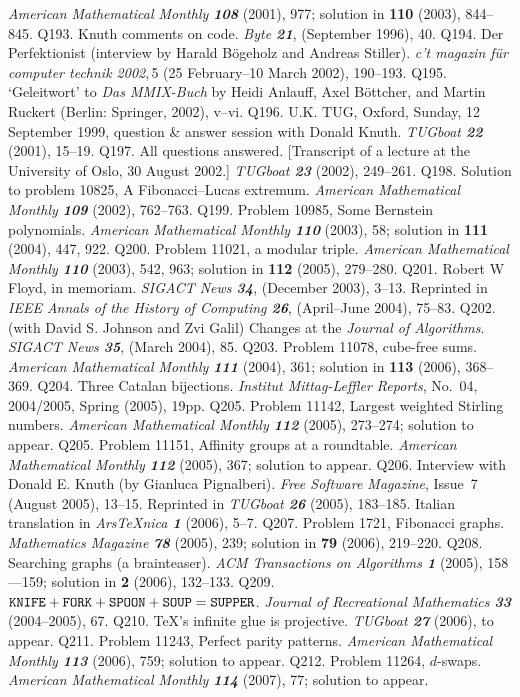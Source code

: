  {\sl American Mathematical Monthly\/ \bf108} (2001), 977;
 solution in {\bf110} (2003), 844--845.
\p Q193. Knuth comments on code. {\sl Byte\/
 \bf21}, (September 1996), 40.
\p Q194. Der Perfektionist (interview by Harald B\"ogeholz and Andreas
 Stiller). {\sl c't magazin f\"ur computer technik 2002},\,5
 (25 February--10 March 2002), 190--193.
\p Q195. `Geleitwort' to {\sl Das {\sltt MMIX\/}-Buch\/} by
 Heidi Anlauff, Axel B\"ottcher, and Martin Ruckert
 (Berlin: Springer, 2002), v--vi.
\p Q196. U.K. TUG, Oxford, Sunday, 12 September 1999, question \& answer
 session with Donald Knuth. {\sl TUGboat\/ \bf22} (2001), 15--19.
\p Q197. All questions answered. [Transcript
 of a lecture at the University of Oslo, 30 August 2002.]
 {\sl TUGboat\/ \bf23} (2002), 249--261.
\p Q198. Solution to problem 10825, A Fibonacci--Lucas extremum.
 {\sl American Mathematical Monthly\/ \bf109} (2002), 762--763.
\p Q199. Problem 10985, Some Bernstein polynomials.
 {\sl American Mathematical Monthly\/ \bf110} (2003), 58;
 solution in {\bf111} (2004), 447, 922.
\p Q200. Problem 11021, a modular triple.
 {\sl American Mathematical Monthly\/ \bf110} (2003), 542, 963;
 solution in {\bf112} (2005), 279--280.
\p Q201. Robert W Floyd, in memoriam. {\sl SIGACT News\/ \bf34},
 (December 2003), 3--13. Reprinted in {\sl IEEE Annals of the History of
 Computing\/ \bf26}, (April--June 2004), 75--83.
\p Q202. (with David S. Johnson and Zvi Galil) Changes at the {\sl Journal
 of Algorithms}. {\sl SIGACT News\/ \bf35}, (March 2004), 85.
\p Q203. Problem 11078, cube-free sums.
 {\sl American Mathematical Monthly\/ \bf111} (2004), 361;
 solution in {\bf113} (2006), 368--369.
\p Q204. Three Catalan bijections. {\sl Institut Mittag-Leffler Reports},
 No.~04, 2004/2005, Spring (2005), 19pp.
\p Q205. Problem 11142, Largest weighted Stirling numbers.
 {\sl American Mathematical Monthly\/ \bf112} (2005), 273--274;
 solution to appear.
\p Q205. Problem 11151, Affinity groups at a roundtable.
 {\sl American Mathematical Monthly\/ \bf112} (2005), 367;
 solution to appear.
\p Q206. Interview with Donald E. Knuth (by Gianluca Pignalberi).
 {\sl Free Software Magazine}, Issue~7 (August 2005), 13--15.
 Reprinted in {\sl TUGboat\/ \bf26} (2005), 183--185.
 Italian translation in {\sl Ars{\TeX}nica\/ \bf1} (2006), 5--7.
\p Q207. Problem 1721, Fibonacci graphs. {\sl Mathematics Magazine\/ \bf78}
 (2005), 239; solution in {\bf79} (2006), 219--220.
\p Q208. Searching graphs (a brainteaser). {\sl ACM Transactions on
 Algorithms\/ \bf1} (2005), 158---159; solution in {\bf2} (2006), 132--133.
\p Q209. $\hbox{\tt KNIFE}+\hbox{\tt FORK}+\hbox{\tt SPOON}+\hbox{\tt SOUP}=
 \hbox{\tt SUPPER}$. {\sl Journal of Recreational Mathematics\/ \bf33}
 (2004--2005), 67.
\p Q210. \TeX's infinite glue is projective. {\sl TUGboat\/ \bf27} (2006),
 to appear.
\p Q211. Problem 11243, Perfect parity patterns.
 {\sl American Mathematical Monthly\/ \bf113} (2006), 759;
 solution to appear.
\p Q212. Problem 11264, $d$-swaps.
 {\sl American Mathematical Monthly\/ \bf114} (2007), 77;
 solution to appear.


